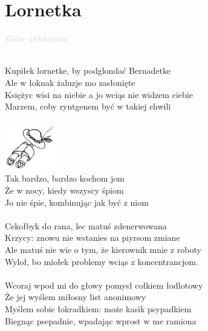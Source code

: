 \documentclass[a5paper, 10pt]{book}
\begin{document}
\newpage
\section{Lornetka}\textcolor{lightgray}{\textit{Golec uOrkiestra}}\\~\\
\begin{minipage}[t]{0.75\textwidth}
  Kupiłek lornetke, by podglondać Bernadetke\\
  Ale w łoknak żaluzje mo zasłonięte\\
  Księżyc wisi na niebie a jo wciąs nie widzem ciebie\\
  Marzem, coby ryntgenem być w takiej chwili\\
  \\
  \includegraphics[height=2cm, right]{images/lornetka.png}\vspace*{-2.05cm}\\
  \hspace*{5mm}Tak bardzo, bardzo kochom jom\\
  \hspace*{5mm}Że w nocy, kiedy wszyscy śpiom\\
  \hspace*{5mm}Jo nie śpie, kombinując jak być z niom\\
  \\
  Cekołbyk do rana, lec matuś zdenerwowana\\
  Krzycy: znowu nie wstanies na piyrsom zmiane\\
  Ale matuś nie wie o tym, że kierownik mnie z roboty\\
  Wyloł, bo miołek problemy wciąs z koncentrancjom.\\
  \\
  Wcoraj wpod mi do głowy pomysł cołkiem łodlotowy\\
  Że jej wyślem miłosny list anonimowy\\
  Myślem sobie łokradkiem: może kasik psypadkiem\\
  Biegnąc psepadnie, wpadając wprost w me ramiona\\
\end{minipage}
\end{document}
